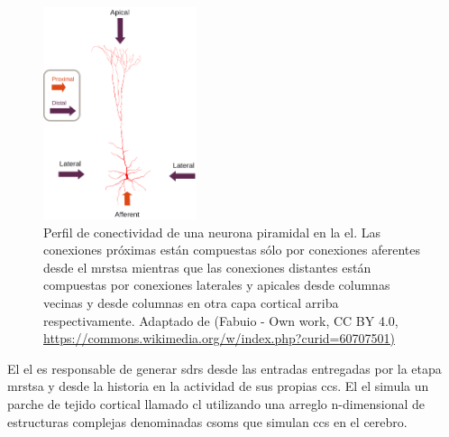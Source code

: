 \begin{figure}[h!]
    \centering
    \includegraphics[width=0.4\textwidth]{Pyramidal_Cell.png}
    \caption{Perfil de conectividad de una neurona piramidal en la \gls{el}.
    Las conexiones próximas están compuestas sólo por conexiones aferentes desde el \gls{mrstsa}
    mientras que las conexiones distantes están compuestas por conexiones laterales y apicales desde columnas vecinas y
    desde columnas en otra capa cortical arriba respectivamente.
    Adaptado de (Fabuio - Own work, CC BY 4.0, \url{https://commons.wikimedia.org/w/index.php?curid=60707501)}}
    \label{fig:Pyramidal_Cell}
\end{figure}

El \gls{el} es responsable de generar \glspl{sdr} desde las entradas entregadas por la etapa \gls{mrstsa} y desde la historia en la actividad de sus propias \glspl{cc}. El \gls{el} simula un parche de tejido cortical llamado \gls{cl} utilizando una arreglo n-dimensional de estructuras complejas denominadas \glspl{csom} que simulan \glspl{cc} en el cerebro.


